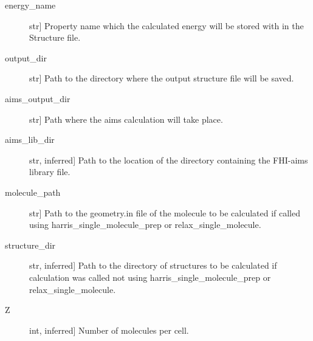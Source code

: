 \documentclass[letterpaper,10pt,english]{sphinxmanual}
\begin{document}
\begin{fulllineitems}
\begin{fulllineitems}
\begin{description}
\item[{energy\_name}] \leavevmode{[}str{]}
Property name which the calculated energy will be stored with in the
Structure file.

\item[{output\_dir}] \leavevmode{[}str{]}
Path to the directory where the output structure file will be saved.

\item[{aims\_output\_dir}] \leavevmode{[}str{]}
Path where the aims calculation will take place.

\item[{aims\_lib\_dir}] \leavevmode{[}str, inferred{]}
Path to the location of the directory containing the FHI-aims library
file.

\item[{molecule\_path}] \leavevmode{[}str{]}
Path to the geometry.in file of the molecule to be calculated if
called using harris\_single\_molecule\_prep or relax\_single\_molecule.

\item[{structure\_dir}] \leavevmode{[}str, inferred{]}
Path to the directory of structures to be calculated if calculation
was called not using harris\_single\_molecule\_prep or
relax\_single\_molecule.

\item[{Z}] \leavevmode{[}int, inferred{]}
Number of molecules per cell.

\end{description}

\end{fulllineitems}


\end{fulllineitems}




\renewcommand{\indexname}{Index}
\printindex
\end{document}
